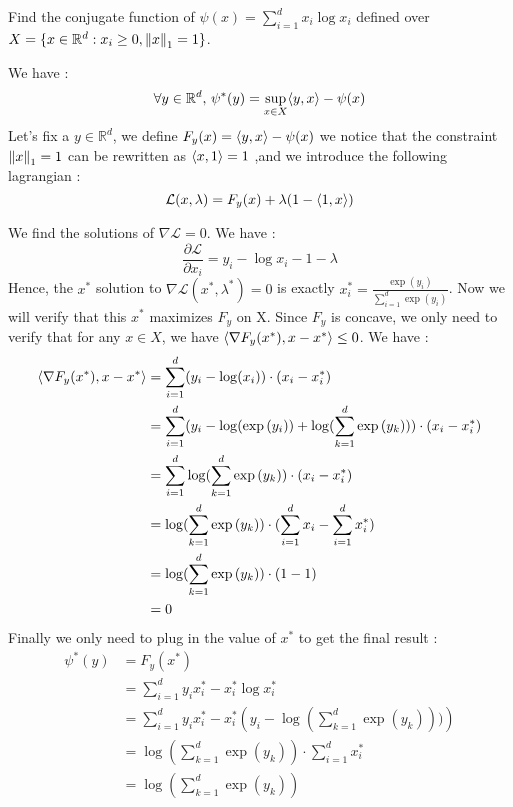 \begin{exercise}[]{}
	Find the conjugate function of $ \psi(x) = \sum_{i=1}^{d}x_i \log x_i $ defined over $ X = \{ x\in \mathbb{R}^d : x_i \geq 0, \left\|x\right\|_1 =1 \} $.
\end{exercise}

\begin{solution}[]
	We have :
\begin{equation*}
	\forall y \in \mathbb{R}^d,\,\psi^{*}(y) = \sup_{x\in X} \langle y,x\rangle-\psi(x)
\end{equation*}
Let's fix a $ y\in \mathbb{R}^d $, we define $ F_y(x) = \langle y,x\rangle - \psi(x) $ we notice that the constraint $ \left\|x\right\|_1 = 1 $ can be rewritten as $ \langle x,1\rangle = 1 $ ,and we introduce the following lagrangian :
\begin{equation*}
	\mathcal{L}(x,\lambda) = F_y(x) + \lambda(1-\langle1,x\rangle)
\end{equation*}

We find the solutions of $ \nabla \mathcal{L} = 0 $. We have :
\begin{equation*}
	\frac{\partial \mathcal{L}}{\partial x_i} = y_i - \log x_i -1 - \lambda 
\end{equation*}
Hence, the $ x^{*} $ solution to $ \nabla \mathcal{L}(x^{*},\lambda^{*})=0$ is exactly $ x_i^{*} = \frac{\exp{(y_i)}}{\sum_{i=1}^{d}\exp{(y_i)}} $. Now we will verify that this $ x^{*} $ maximizes $ F_y $ on X. Since $ F_y $ is concave, we only need to verify that for any $ x\in X $, we have $ \langle\nabla F_y(x^{*}),x-x^{*}\rangle \leq 0 $. We have :
\begin{align*}
	\langle\nabla F_y(x^{*}),x-x^{*}\rangle &= \sum_{i=1}^{d}(y_i-\log(x_i))\cdot (x_i-x^{*}_i) \\
					    &= \sum_{i=1}^{d}(y_i -\log(\exp{(y_i)})+\log(\sum_{k=1}^{d}\exp{(y_k)}))\cdot (x_i-x^{*}_i) \\
					    &= \sum_{i=1}^{d}\log(\sum_{k=1}^{d}\exp{(y_k)})\cdot (x_i-x^{*}_i) \\
					    &= \log(\sum_{k=1}^{d}\exp{(y_k)})\cdot (\sum_{i=1}^{d}x_i - \sum_{i=1}^{d}x^{*}_i) \\
					    &=\log(\sum_{k=1}^{d}\exp{(y_k)})\cdot (1-1) \\
					    &= 0
\end{align*}
Finally we only need to plug in the value of $ x^{*} $ to get the final result :
\begin{align*}
	\psi^{*}(y) &= F_y(x^{*}) \\
		    &= \sum_{i=1}^{d} y_i x^{*}_i -x^{*}_i \log x^{*}_i \\
		    &= \sum_{i=1}^{d} y_i x_i^{*} -x^{*}_i \left( y_i - \log(\sum_{k=1}^{d}\exp{(y_k)})) \right) \\
		    &= \log \left( \sum_{k=1}^{d}\exp{(y_k)} \right) \cdot \sum_{i=1}^{d}x^{*}_i \\
		    &= \log \left( \sum_{k=1}^{d}\exp{(y_k)} \right)
\end{align*}




\end{solution}
